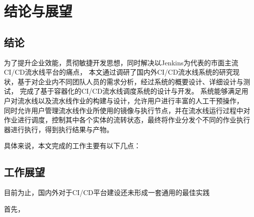 
\chapter{结论与展望}

\section{结论}

为了提升企业效能，贯彻敏捷开发思想，同时解决以Jenkins为代表的市面主流CI/CD流水线平台的痛点，
本文通过调研了国内外CI/CD流水线系统的研究现状，基于对企业内不同团队人员的需求分析，经过系统的概要设计、详细设计与测试，
完成了基于容器化的CI/CD流水线调度系统的设计与开发。
系统能够满足用户对流水线以及流水线作业的构建与设计，允许用户进行丰富的人工干预操作，
同时允许用户管理流水线作业所使用的镜像与执行节点，并在流水线运行过程中对作业进行调度，控制其中各个实体的流转状态，最终将作业分发个不同的作业执行器进行执行，得到执行结果与产物。

具体来说，本文完成的工作主要有以下几点：



\section{工作展望}

目前为止，国内外对于CI/CD平台建设还未形成一套通用的最佳实践

首先，